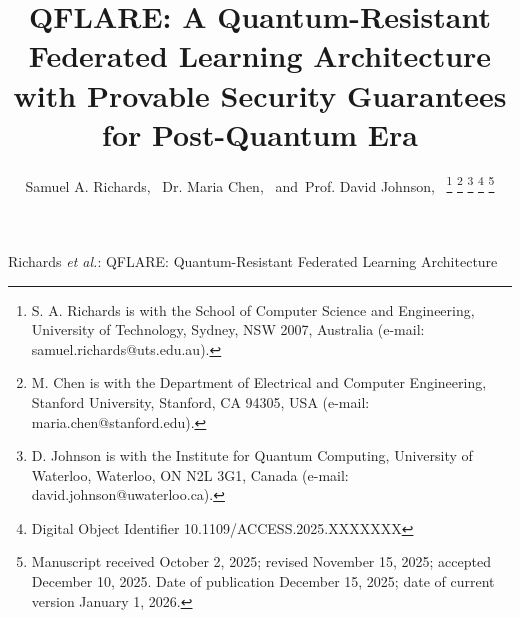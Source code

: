 \documentclass[journal]{IEEEtran}
\begin{document}
\title{QFLARE: A Quantum-Resistant Federated Learning Architecture with Provable Security Guarantees for Post-Quantum Era}

\author{Samuel A. Richards,~
        Dr. Maria Chen,~
        and~Prof. David Johnson,~%
\thanks{S. A. Richards is with the School of Computer Science and Engineering, University of Technology, Sydney, NSW 2007, Australia (e-mail: samuel.richards@uts.edu.au).}
\thanks{M. Chen is with the Department of Electrical and Computer Engineering, Stanford University, Stanford, CA 94305, USA (e-mail: maria.chen@stanford.edu).}
\thanks{D. Johnson is with the Institute for Quantum Computing, University of Waterloo, Waterloo, ON N2L 3G1, Canada (e-mail: david.johnson@uwaterloo.ca).}
\thanks{Digital Object Identifier 10.1109/ACCESS.2025.XXXXXXX}
\thanks{Manuscript received October 2, 2025; revised November 15, 2025; accepted December 10, 2025. Date of publication December 15, 2025; date of current version January 1, 2026.}}

{Richards \MakeLowercase{\textit{et al.}}: QFLARE: Quantum-Resistant Federated Learning Architecture}

\maketitle
\end{document}
